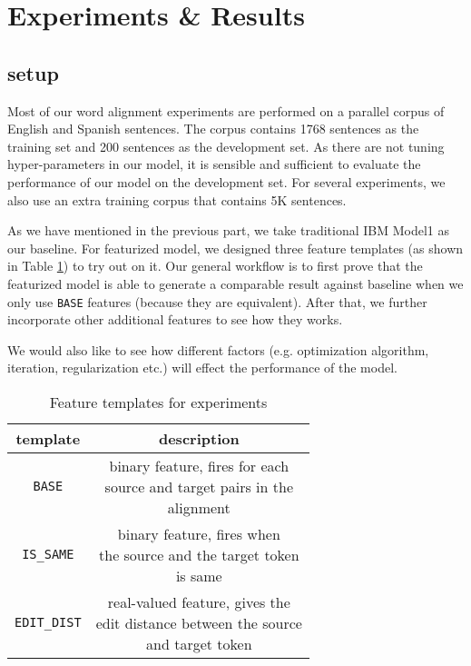 \documentclass[11pt,letterpaper]{article}
\begin{document}
\section{Experiments \& Results}
\subsection{setup}
Most of our word alignment experiments are performed on a parallel corpus of English and Spanish sentences.
The corpus contains 1768 sentences as the training set and 200 sentences as the development set.
As there are not tuning hyper-parameters in our model, it is sensible and sufficient to evaluate the performance of our model on the development set.
For several experiments, we also use an extra training corpus that contains 5K %
sentences.

As we have mentioned in the previous part, we take traditional IBM Model1 as our baseline.
For featurized model, we designed three feature templates (as shown in Table \ref{featureset-table}) to try out on it.
Our general workflow is to first prove that the featurized model is able to generate a comparable result against baseline when we only use \texttt{BASE} features (because they are equivalent).
After that, we further incorporate other additional features to see how they works.

We would also like to see how different factors (e.g. optimization algorithm, iteration, regularization etc.) will effect the performance of the model.

\begin{table}
\begin{center}
\begin{tabular}{|c|c|}
\hline 
\bf template & \bf description \\
\hline
\texttt{BASE} & \makecell[l]{binary feature, fires for each\\ source and target pairs in the\\ alignment} \\
\texttt{IS\_SAME} & \makecell[l]{binary feature, fires when\\ the source and the target token\\ is same}\\
\texttt{EDIT\_DIST} & \makecell[l]{real-valued feature, gives the\\ edit distance between the source\\ and target token}\\
\hline
\end{tabular}
\end{center}
\caption{\label{featureset-table} Feature templates for experiments}
\end{table}
\end{document}
